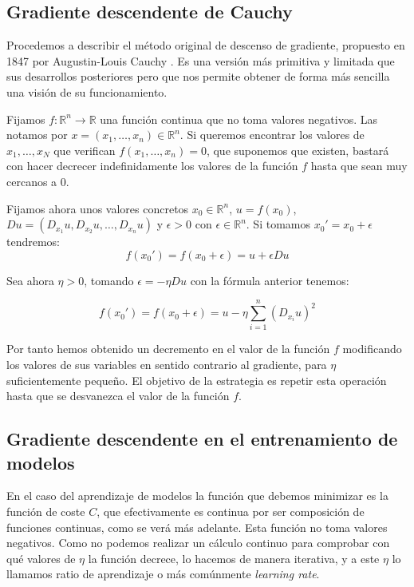 \subsection{Gradiente descendente de Cauchy}

Procedemos a describir el método original de descenso de gradiente, propuesto en 1847 por Augustin-Louis Cauchy \cite{CauchyGD}. Es una versión más primitiva y limitada que sus desarrollos posteriores pero que nos permite obtener de forma más sencilla una visión de su funcionamiento. 

Fijamos $f:\mathbb{R}^n \rightarrow \mathbb{R}$ una función continua que no toma valores negativos. Las notamos por $x= \left ( x_1,\ldots,x_n \right ) \in \mathbb{R}^n$. Si queremos encontrar los valores de $x_1,\ldots,x_N$ que verifican $f(x_1,\ldots,x_n)=0$, que suponemos que existen, bastará con hacer decrecer indefinidamente los valores de la función $f$ hasta que sean muy cercanos a $0$. 

Fijamos ahora unos valores concretos $x_0 \in \mathbb{R}^n$, $u=f(x_0)$,\\ $Du= \left ( D_{x_1}u, D_{x_2}u, \ldots, D_{x_n}u \right )$ y $\epsilon >0$ con $\epsilon \in \mathbb{R}^n$. Si tomamos $x_0'=x_0+\epsilon$ tendremos:
$$f(x_0')= f(x_0 + \epsilon) = u + \epsilon Du$$

Sea ahora $\eta >0$, tomando $\epsilon= - \eta Du$ con la fórmula anterior tenemos: 

$$f(x_0') = f(x_0 + \epsilon) = u - \eta \sum_{i=1}^{n}(D_{x_i}u)^2$$

Por tanto hemos obtenido un decremento en el valor de la función $f$ modificando los valores de sus variables en sentido contrario al gradiente, para $\eta$ suficientemente pequeño. El objetivo de la estrategia es repetir esta operación hasta que se desvanezca el valor de la función $f$.




\subsection{Gradiente descendente en el entrenamiento de modelos}

En el caso del aprendizaje de modelos la función que debemos minimizar es la función de coste $C$, que efectivamente es continua por ser composición de funciones continuas, como se verá más adelante. Esta función no toma valores negativos. Como no podemos realizar un cálculo continuo para comprobar con qué valores de $\eta$ la función decrece, lo hacemos de manera iterativa, y a este $\eta$ lo llamamos ratio de aprendizaje o más comúnmente \textit{learning rate}. 


